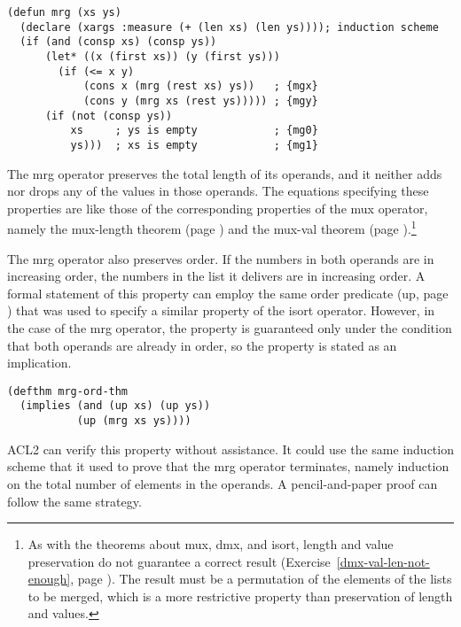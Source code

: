 \label{defun:mrg}
\begin{Verbatim}
(defun mrg (xs ys)
  (declare (xargs :measure (+ (len xs) (len ys)))); induction scheme
  (if (and (consp xs) (consp ys))
      (let* ((x (first xs)) (y (first ys)))
        (if (<= x y)
            (cons x (mrg (rest xs) ys))   ; {mgx}
            (cons y (mrg xs (rest ys))))) ; {mgy}
      (if (not (consp ys))
          xs     ; ys is empty            ; {mg0}
          ys)))  ; xs is empty            ; {mg1}
\end{Verbatim}

The mrg operator preserves the total length of its operands,
and it neither adds nor drops any of the values in those operands.
The equations specifying these properties are like those of the
corresponding properties of the mux operator, namely
the mux-length theorem (page \pageref{mux-length-thm}) and the
mux-val theorem (page \pageref{thm:mux-val}).\footnote{As
with the theorems about
mux, dmx, and isort, length and value preservation
do not guarantee a correct result
(Exercise~\ref{dmx-val-len-not-enough}, page \pageref{dmx-val-len-not-enough}).
The result must be a permutation
of the elements of the lists to be merged,
which is a more restrictive property than
preservation of length and values.}

The mrg operator also preserves order.
If the numbers in both operands are in increasing order,
the numbers in the list it delivers are in increasing order.
A formal statement of this property can employ the same order predicate
(up, page \pageref{defun:up}) that was used to specify a
similar property of the isort operator.
However, in the case of the mrg operator,
the property is guaranteed only under the condition
that both operands are already in order,
so the property is stated as an implication.

\label{defthm:mrg-ord}
\begin{Verbatim}
(defthm mrg-ord-thm
  (implies (and (up xs) (up ys))
           (up (mrg xs ys))))
\end{Verbatim}

ACL2 can verify this property without assistance.
It could use the same induction scheme that it used
to prove that the mrg operator terminates,
namely induction on the total number of elements in the operands.
A pencil-and-paper proof can follow the same strategy.

